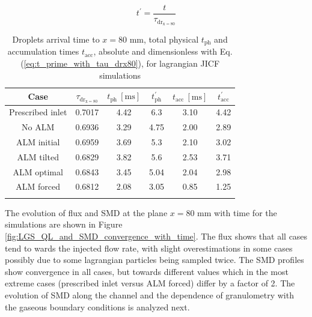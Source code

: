 \begin{equation}
\label{eq:t_prime_with_tau_drx80}
t^{\prime} = \frac{t}{\tau_\mathrm{dr_{x=80}}}
\end{equation}



\begin{table}[!h]
\centering
\caption{Droplets arrival time to $x = 80$ mm, total physical $t_\mathrm{ph}$ and accumulation times $t_\mathrm{acc}$, absolute and dimensionless with Eq. (\ref{eq:t_prime_with_tau_drx80}), for lagrangian JICF simulations}
\begin{tabular}{cccccc}
\thickhline
\textbf{Case} & $\tau_\mathrm{dr_{x=80}}$ & $t_\mathrm{ph}~[\mathrm{ms}]$ &  $t_\mathrm{ph}^{\prime}$ & $t_\mathrm{acc}~[\mathrm{ms}]$  & $t_\mathrm{acc}^{\prime}$  \\
\hline
Prescribed inlet & 0.7017 & 4.42 & 6.3 & 3.10 & 4.42 \\
No ALM & 0.6936 & 3.29 & 4.75 & 2.00 & 2.89 \\
ALM initial & 0.6959 & 3.69 & 5.3 & 2.10 & 3.02 \\
ALM tilted & 0.6829 & 3.82 & 5.6 & 2.53 & 3.71 \\
ALM optimal & 0.6843 & 3.45 & 5.04 & 2.04 & 2.98 \\
ALM forced  & 0.6812 & 2.08 & 3.05 & 0.85 & 1.25 \\
\thickhline
\end{tabular}
\label{tab:jicf_LGS_t_prime_accumulation}
\end{table}

	The evolution of flux and SMD at the plane $x = 80$ mm with time for the simulations are shown in Figure \ref{fig:LGS_QL_and_SMD_convergence_with_time}. The flux shows that all cases tend to wards the injected flow rate, with slight overestimations in some cases possibly due to some lagrangian particles being sampled twice. The SMD profiles show convergence in all cases, but towards different values which in the most extreme cases (prescribed inlet versus ALM forced) differ by a factor of 2. The evolution of SMD along the channel and the dependence of granulometry with the gaseous boundary conditions is analyzed next.
	
\clearpage

